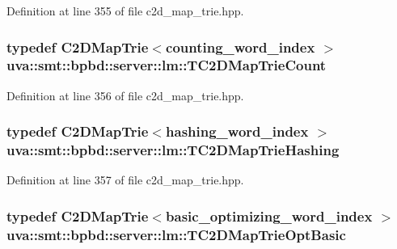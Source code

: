 Definition at line 355 of file c2d\+\_\+map\+\_\+trie.\+hpp.

\hypertarget{namespaceuva_1_1smt_1_1bpbd_1_1server_1_1lm_a56d9208d73838d355ee00f89b63dc2eb}{}
\subsubsection[{T\+C2\+D\+Map\+Trie\+Count}]{\setlength{\rightskip}{0pt plus 5cm}typedef {\bf C2\+D\+Map\+Trie}$<${\bf counting\+\_\+word\+\_\+index} $>$ {\bf uva\+::smt\+::bpbd\+::server\+::lm\+::\+T\+C2\+D\+Map\+Trie\+Count}}\label{namespaceuva_1_1smt_1_1bpbd_1_1server_1_1lm_a56d9208d73838d355ee00f89b63dc2eb}


Definition at line 356 of file c2d\+\_\+map\+\_\+trie.\+hpp.

\hypertarget{namespaceuva_1_1smt_1_1bpbd_1_1server_1_1lm_a12fccfd31806fb43e8a74e287d49a464}{}
\subsubsection[{T\+C2\+D\+Map\+Trie\+Hashing}]{\setlength{\rightskip}{0pt plus 5cm}typedef {\bf C2\+D\+Map\+Trie}$<${\bf hashing\+\_\+word\+\_\+index} $>$ {\bf uva\+::smt\+::bpbd\+::server\+::lm\+::\+T\+C2\+D\+Map\+Trie\+Hashing}}\label{namespaceuva_1_1smt_1_1bpbd_1_1server_1_1lm_a12fccfd31806fb43e8a74e287d49a464}


Definition at line 357 of file c2d\+\_\+map\+\_\+trie.\+hpp.

\hypertarget{namespaceuva_1_1smt_1_1bpbd_1_1server_1_1lm_a09b86a457aa219fca926fa7dd53f87d4}{}
\subsubsection[{T\+C2\+D\+Map\+Trie\+Opt\+Basic}]{\setlength{\rightskip}{0pt plus 5cm}typedef {\bf C2\+D\+Map\+Trie}$<${\bf basic\+\_\+optimizing\+\_\+word\+\_\+index} $>$ {\bf uva\+::smt\+::bpbd\+::server\+::lm\+::\+T\+C2\+D\+Map\+Trie\+Opt\+Basic}}\label{namespaceuva_1_1smt_1_1bpbd_1_1server_1_1lm_a09b86a457aa219fca926fa7dd53f87d4}


